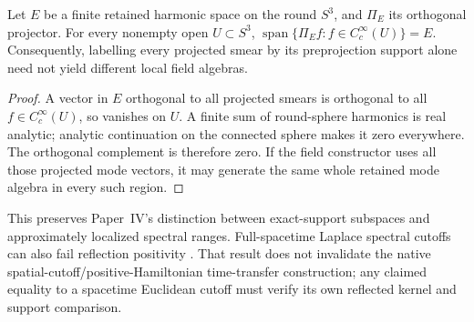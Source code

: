 \documentclass[12pt,a4paper]{article}
\begin{document}
\begin{lemma}
\label{p12:lem:v2210-lit-spectral-support}
Let $E$ be a finite retained harmonic space on the round $S^3$, and
$\Pi_E$ its orthogonal projector. For every nonempty open $U\subset S^3$,
$\operatorname{span}\{\Pi_Ef:f\in C_c^\infty(U)\}=E$.
Consequently, labelling every projected smear by its preprojection support
alone need not yield different local field algebras.
\end{lemma}
\begin{proof}
A vector in $E$ orthogonal to all projected smears is orthogonal to all
$f\in C_c^\infty(U)$, so vanishes on $U$. A finite sum of round-sphere
harmonics is real analytic; analytic continuation on the connected sphere
makes it zero everywhere. The orthogonal complement is therefore zero.
If the field constructor uses all those projected mode vectors, it may
generate the same whole retained mode algebra in every such region.
\end{proof}
This preserves Paper~IV's distinction between exact-support subspaces and
approximately localized spectral ranges. Full-spacetime Laplace spectral
cutoffs can also fail reflection positivity
\cite{LitQFTBailleulCutoff2023}. That result does not invalidate the
native spatial-cutoff/positive-Hamiltonian time-transfer construction;
any claimed equality to a spacetime Euclidean cutoff must verify its own
reflected kernel and support comparison.


\end{document}
